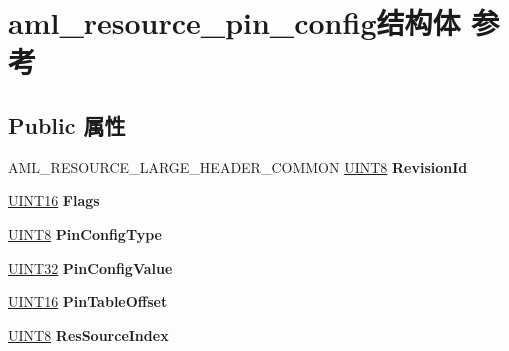 \hypertarget{structaml__resource__pin__config}{}\section{aml\+\_\+resource\+\_\+pin\+\_\+config结构体 参考}
\label{structaml__resource__pin__config}
\subsection*{Public 属性}
\begin{DoxyCompactItemize}
\item 
\mbox{\label{structaml__resource__pin__config_ad09303a98272eff5e1a9743c1b730a84}} 
A\+M\+L\+\_\+\+R\+E\+S\+O\+U\+R\+C\+E\+\_\+\+L\+A\+R\+G\+E\+\_\+\+H\+E\+A\+D\+E\+R\+\_\+\+C\+O\+M\+M\+ON \hyperlink{_processor_bind_8h_ab27e9918b538ce9d8ca692479b375b6a}{U\+I\+N\+T8} {\bfseries Revision\+Id}
\item 
\mbox{\label{structaml__resource__pin__config_a564e0bc0f7db6be25cf3fd3bd0ab690e}} 
\hyperlink{_processor_bind_8h_a09f1a1fb2293e33483cc8d44aefb1eb1}{U\+I\+N\+T16} {\bfseries Flags}
\item 
\mbox{\label{structaml__resource__pin__config_acabd7270f828444a5ce47adce498204f}} 
\hyperlink{_processor_bind_8h_ab27e9918b538ce9d8ca692479b375b6a}{U\+I\+N\+T8} {\bfseries Pin\+Config\+Type}
\item 
\mbox{\label{structaml__resource__pin__config_a11b7e7b81adc43ae853e6b94e7060049}} 
\hyperlink{_processor_bind_8h_ae1e6edbbc26d6fbc71a90190d0266018}{U\+I\+N\+T32} {\bfseries Pin\+Config\+Value}
\item 
\mbox{\label{structaml__resource__pin__config_ac1ce13d8845339e6984e53be3c585cff}} 
\hyperlink{_processor_bind_8h_a09f1a1fb2293e33483cc8d44aefb1eb1}{U\+I\+N\+T16} {\bfseries Pin\+Table\+Offset}
\item 
\mbox{\label{structaml__resource__pin__config_a86a64bf5784a0bf2622b1ebd6235efea}} 
\hyperlink{_processor_bind_8h_ab27e9918b538ce9d8ca692479b375b6a}{U\+I\+N\+T8} {\bfseries Res\+Source\+Index}

\end{DoxyCompactItemize}
